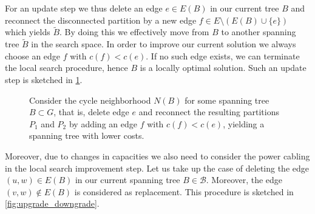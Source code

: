 For an update step we thus delete an edge $e\in E(B)$ in our current tree $B$ and reconnect the disconnected partition by a new edge $f\in E\setminus{(E(B)\cup\{e\})}$ which yields $\tilde{B}$. By doing this we effectively move from $B$ to another spanning tree $\tilde{B}$ in the search space. In order to improve our current solution we always choose an edge $f$ with $c(f) < c(e)$. If no such edge exists, we can terminate the local search procedure, hence $B$ is a locally optimal solution. Such an update step is sketched in \cref{fig:local_search_mst_step}.
\begin{figure}[H]
  \center
  \caption{Consider the cycle neighborhood $N(B)$ for some spanning tree $B\subset G$, that is, delete edge $e$ and reconnect the resulting partitions $P_1$ and $P_2$ by adding an edge $f$ with $c(f) < c(e)$, yielding a spanning tree with lower costs.}
  \label{fig:local_search_mst_step}
\end{figure}
\noindent
Moreover, due to changes in capacities we also need to consider the power cabling in the local search improvement step. Let us take up the case of deleting the edge $(u,w)\in E(B)$ in our current spanning tree $B\in\mathcal{B}$. Moreover, the edge $(v,w)\notin E(B)$ is considered as replacement. This procedure is sketched in \cref{fig:upgrade_downgrade}.
